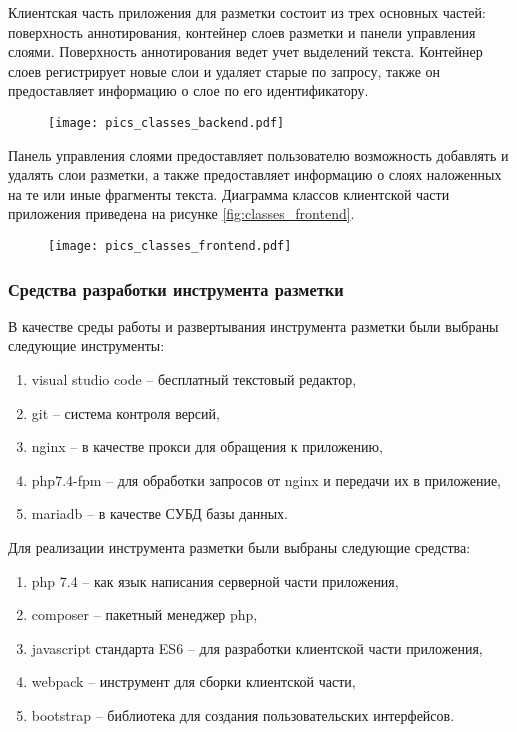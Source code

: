 \documentclass[../main]{subfiles}
\begin{document}
Клиентская часть приложения для разметки состоит из трех основных частей: поверхность аннотирования, контейнер слоев разметки и панели управления слоями. Поверхность аннотирования ведет учет выделений текста. Контейнер слоев регистрирует новые слои и удаляет старые по запросу, также он предоставляет информацию о слое по его идентификатору.

\begin{figure}[H]
    \centering
    \vspace{2\baselineskip}
    {\texttt{[image: pics\_classes\_backend.pdf]}}
    \vspace{-\baselineskip}
\end{figure}

 Панель управления слоями предоставляет пользователю возможность добавлять и удалять слои разметки, а также предоставляет информацию о слоях наложенных на те или иные фрагменты текста. Диаграмма классов клиентской части приложения приведена на рисунке \ref{fig:classes_frontend}.

\begin{figure}[H]
    \centering
    {\texttt{[image: pics\_classes\_frontend.pdf]}}
    \vspace{-\baselineskip}
\end{figure}

\subsubsection{Средства разработки инструмента разметки}
В качестве среды работы и развертывания инструмента разметки были выбраны следующие инструменты:
\begin{enumerate}
    \item visual studio code -- бесплатный текстовый редактор,
    \item git -- система контроля версий,
    \item nginx -- в качестве прокси для обращения к приложению,
    \item php7.4-fpm -- для обработки запросов от nginx и передачи их в приложение,
    \item mariadb -- в качестве СУБД базы данных.
\end{enumerate}

Для реализации инструмента разметки были выбраны следующие средства:
\begin{enumerate}
    \item php 7.4 -- как язык написания серверной части приложения,
    \item composer -- пакетный менеджер php,
    \item javascript стандарта ES6 -- для разработки клиентской части приложения,
    \item webpack -- инструмент для сборки клиентской части,
    \item bootstrap -- библиотека для создания пользовательских интерфейсов.
\end{enumerate}
\end{document}
